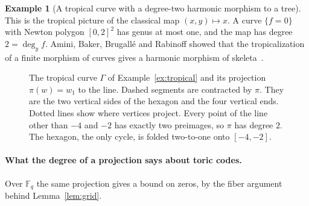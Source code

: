 \documentclass[12pt,letterpaper]{article}
\numberwithin{equation}{section}
\theoremstyle{definition}
\newtheorem{example}[theorem]{Example}
\theoremstyle{remark}
\newcommand{\R}{\mathbb{R}}
\newcommand{\Fq}{\mathbb{F}_q}
\begin{document}
\begin{example}[A tropical curve with a degree-two harmonic morphism to a
tree]
This is the tropical picture of the classical map $(x,y)\mapsto x$. A curve
$\{f=0\}$ with Newton polygon $[0,2]^2$ has genus at most one, and the map has
degree $2=\deg_yf$. Amini, Baker, Brugall\'e and Rabinoff showed that the
tropicalization of a finite morphism of curves gives a harmonic morphism of
skeleta~\cite{ABBR15}.
\end{example}

\begin{figure}[ht]
\centering
{}
\caption{The tropical curve $\Gamma$ of Example~\ref{ex:tropical} and its
projection $\pi(w)=w_1$ to the line. Dashed segments are contracted by $\pi$.
They are the two vertical sides of the hexagon and the four vertical ends.
Dotted lines show where vertices project. Every point of the line other than
$-4$ and $-2$ has exactly two preimages, so $\pi$ has degree $2$. The hexagon,
the only cycle, is folded two-to-one onto $[-4,-2]$.}\label{fig:tropical}
\end{figure}

\paragraph{What the degree of a projection says about toric codes.}
Over $\Fq$ the same projection gives a bound on zeros, by the fiber argument
behind Lemma~\ref{lem:grid}.
\end{document}
